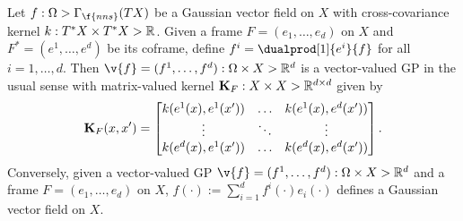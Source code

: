 \begin{proposition}
	\label{prop:matrix-representation-appendix}
	Let $f : \Omega \-> \Gamma_{\f{nns}}(TX)$ be a Gaussian vector field on $X$ with cross-covariance kernel ${k : T^*X \times T^*X \-> \mathbb{R}}$.
	Given a frame $F = (e_1, \ldots, e_d)$ on $X$ and $F^* = (e^1, \ldots, e^d)$ be its coframe, define $f^i = \dualprod[1]{e^i}{f}$ for all $i = 1, \ldots, d$.
	Then $\v{f} = (f^1, \ldots, f^d) : \Omega \x X \-> \R^d$ is a vector-valued GP in the usual sense with matrix-valued kernel ${\m{K}_F : X \x X \-> \R^{d \x d}}$ given by \[ \m{K}_F(x, x') = \begin{bmatrix} k(e^1(x), e^1(x')) & \dots & k(e^1(x), e^d(x')) \\ \vdots & \ddots & \vdots \\ k(e^d(x), e^1(x')) & \dots & k(e^d(x), e^d(x')) \end{bmatrix}.
	\]
	Conversely, given a vector-valued GP $\v{f} = (f^1, \ldots, f^d): \Omega \x X \-> \R^d$ and a frame $F = (e_1, \ldots, e_d)$ on $X$, $f(\cdot) := \sum_{i=1}^d f^i(\cdot) e_i(\cdot)$ defines a Gaussian vector field on $X$.
\end{proposition}

